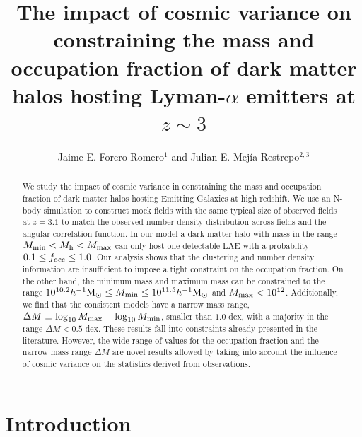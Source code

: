 \documentclass{emulateapj}
\newcommand{\ly}{{\ifmmode{{\rm Ly}\alpha}\else{Ly$\alpha$~}\fi}}
\newcommand{\hMsun}{{\ifmmode{h^{-1}{\rm
        {M_{\odot}}}}\else{$h^{-1}{\rm{M_{\odot}}}$}\fi}}
\begin{document}
\title{The impact of cosmic variance on constraining the mass and
  occupation fraction of dark matter halos hosting Lyman-$\alpha$
  emitters at $z \sim 3$}      
\author{
  Jaime E. Forero-Romero$^{1}$ and
  Julian E. Mej\'ia-Restrepo$^{2,3}$ 
}




\begin{abstract}
%
  We study the impact of cosmic variance in constraining the mass and
  occupation fraction of dark matter halos hosting \ly Emitting
  Galaxies at high redshift. We use an N-body simulation to construct
  mock fields with the same typical size of observed fields at
  $z=3.1$ to match the observed number density distribution across
  fields and the angular correlation function. In our model a dark
  matter halo with mass in the range $M_{\rm min}<M_{\rm h}<M_{\rm
    max}$ can only host one detectable LAE with a probability $0.1
  \leq f_{\rm occ}\leq 1.0$.  Our analysis shows that the clustering
  and number density information are insufficient to impose a tight
  constraint on the occupation fraction. On the other hand, the
  minimum mass and maximum mass can be constrained to the range
$10^{10.2}\hMsun\leq M_{\rm min}\leq 10^{11.5}\hMsun$ and $M_{\rm  max}<10^{12}$\hMsun.
Additionally, we find that the
  consistent models have a narrow mass range, $\Delta M \equiv \log_{10}M_{\rm max} -
  \log_{10} M_{\rm min}$, smaller than $1.0$ dex, with a majority in
  the range $\Delta M<0.5$ dex. These results fall into constraints
  already presented in the literature. However, the wide range of
  values for the occupation fraction and the narrow mass range $\Delta
  M$ are novel results allowed by taking into account the influence of
  cosmic variance on the statistics derived from observations.  
\end{abstract}





\section{Introduction}
\end{document}
